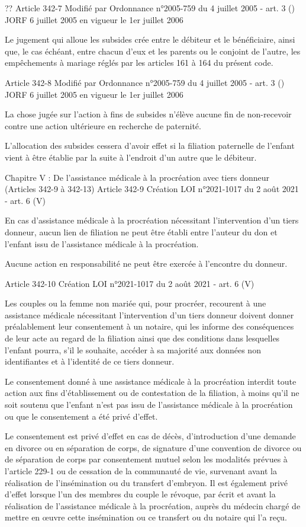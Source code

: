 \documentclass[
  12pt,
]{book}
\begin{document}
\begin{encadre}{??}
Article 342-7
Modifié par Ordonnance n°2005-759 du 4 juillet 2005 - art. 3 () JORF 6 juillet 2005 en vigueur le 1er juillet 2006

Le jugement qui alloue les subsides crée entre le débiteur et le bénéficiaire, ainsi que, le cas échéant, entre chacun d'eux et les parents ou le conjoint de l'autre, les empêchements à mariage réglés par les articles 161 à 164 du présent code.

Article 342-8
Modifié par Ordonnance n°2005-759 du 4 juillet 2005 - art. 3 () JORF 6 juillet 2005 en vigueur le 1er juillet 2006

La chose jugée sur l'action à fins de subsides n'élève aucune fin de non-recevoir contre une action ultérieure en recherche de paternité.

L'allocation des subsides cessera d'avoir effet si la filiation paternelle de l'enfant vient à être établie par la suite à l'endroit d'un autre que le débiteur.

Chapitre V : De l'assistance médicale à la procréation avec tiers donneur (Articles 342-9 à 342-13)
Article 342-9
Création LOI n°2021-1017 du 2 août 2021 - art. 6 (V)

En cas d'assistance médicale à la procréation nécessitant l'intervention d'un tiers donneur, aucun lien de filiation ne peut être établi entre l'auteur du don et l'enfant issu de l'assistance médicale à la procréation.

Aucune action en responsabilité ne peut être exercée à l'encontre du donneur.

Article 342-10
Création LOI n°2021-1017 du 2 août 2021 - art. 6 (V)

Les couples ou la femme non mariée qui, pour procréer, recourent à une assistance médicale nécessitant l'intervention d'un tiers donneur doivent donner préalablement leur consentement à un notaire, qui les informe des conséquences de leur acte au regard de la filiation ainsi que des conditions dans lesquelles l'enfant pourra, s'il le souhaite, accéder à sa majorité aux données non identifiantes et à l'identité de ce tiers donneur.

Le consentement donné à une assistance médicale à la procréation interdit toute action aux fins d'établissement ou de contestation de la filiation, à moins qu'il ne soit soutenu que l'enfant n'est pas issu de l'assistance médicale à la procréation ou que le consentement a été privé d'effet.

Le consentement est privé d'effet en cas de décès, d'introduction d'une demande en divorce ou en séparation de corps, de signature d'une convention de divorce ou de séparation de corps par consentement mutuel selon les modalités prévues à l'article 229-1 ou de cessation de la communauté de vie, survenant avant la réalisation de l'insémination ou du transfert d'embryon. Il est également privé d'effet lorsque l'un des membres du couple le révoque, par écrit et avant la réalisation de l'assistance médicale à la procréation, auprès du médecin chargé de mettre en œuvre cette insémination ou ce transfert ou du notaire qui l'a reçu.


\end{encadre}
\end{document}
